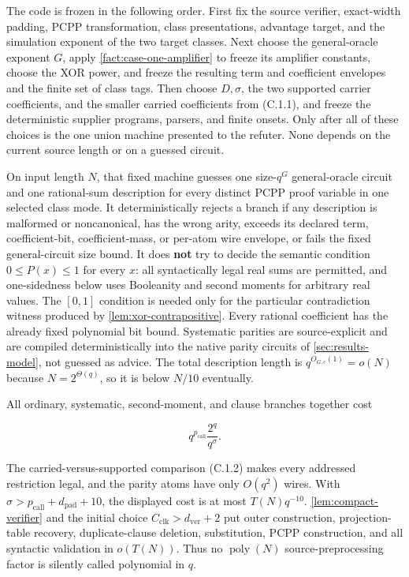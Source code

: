 \documentclass[11pt,letterpaper]{article}
\newcommand{\cref}[1]{\ref{#1}}
\theoremstyle{definition}
\theoremstyle{remark}
\begin{document}
The code is frozen in the following order. First fix the source
verifier, exact-width padding, PCPP transformation, class presentations,
advantage target, and the simulation exponent of the two target classes.
Next choose the general-oracle exponent \(G\), apply \cref{fact:case-one-amplifier} to
freeze its amplifier constants, choose the XOR power, and freeze the
resulting term and coefficient envelopes and the finite set of class
tags. Then choose \(D,\sigma\), the two supported carrier coefficients,
and the smaller carried coefficients from (C.1.1), and freeze the
deterministic supplier programs, parsers, and finite onsets. Only after
all of these choices is the one union machine presented to the refuter.
None depends on the current source length or on a guessed circuit.

On input length \(N\), that fixed machine guesses one size-\(q^G\)
general-oracle circuit and one rational-sum description for every
distinct PCPP proof variable in one selected class mode. It
deterministically rejects a branch if any description is malformed or
noncanonical, has the wrong arity, exceeds its declared term,
coefficient-bit, coefficient-mass, or per-atom wire envelope, or fails
the fixed general-circuit size bound. It does \textbf{not} try to decide
the semantic condition \(0\le P(x)\le1\) for every \(x\): all
syntactically legal real sums are permitted, and one-sidedness below
uses Booleanity and second moments for arbitrary real values. The
\([0,1]\) condition is needed only for the particular contradiction
witness produced by \cref{lem:xor-contrapositive}. Every rational coefficient has the
already fixed polynomial bit bound. Systematic parities are
source-explicit and are compiled deterministically into the native
parity circuits of \cref{sec:results-model}, not guessed as advice. The total description
length is \(q^{O_{G,c}(1)}=o(N)\) because \(N=2^{\Theta(q)}\), so it is
below \(N/10\) eventually.

All ordinary, systematic, second-moment, and clause branches together
cost

\[
q^{p_{\mathrm{call}}}
\frac{2^q}{q^\sigma}.
\]

The carried-versus-supported comparison (C.1.2) makes every addressed
restriction legal, and the parity atoms have only \(O(q^2)\) wires. With
\(\sigma>p_{\mathrm{call}}+d_{\mathrm{pad}}+10\), the displayed cost is
at most \(T(N)q^{-10}\). \cref{lem:compact-verifier} and the initial choice
\(C_{\mathrm{clk}}>d_{\mathrm{ver}}+2\) put outer construction, projection-table
recovery, duplicate-clause deletion, substitution, PCPP construction,
and all syntactic validation in \(o(T(N))\). Thus no
\(\operatorname{poly}(N)\) source-preprocessing factor is silently
called polynomial in \(q\).
\end{document}
